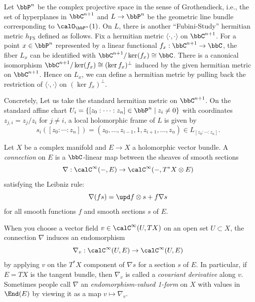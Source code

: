 \begin{example}\label{eg:Fubini-Study_metric_on_O_1}
	Let \(\bbP^n\) be the complex projective space in the sense of Grothendieck, i.e., the set of hyperplanes in \(\bbC^{n+1}\) and \(L \to \bbP^n\) be the geometric line bundle corresponding to \(\calO_{\bbP^n}(1)\).
	On \(L\), there is another ``Fubini-Study'' hermitian metric \(h_{\text{FS}}\) defined as follows.
	Fix a hermitian metric \(\langle \cdot, \cdot \rangle\) on \(\bbC^{n+1}\).
	For a point \(x \in \bbP^n\) represented by a linear functional \(f_x: \bbC^{n+1} \to \bbC\), the fiber \(L_x\) can be identified with \(\bbC^{n+1}/\ker(f_x) \cong \bbC\).
	There is a canonical isomorphism \(\bbC^{n+1}/\ker(f_x) \cong (\ker f_x)^\perp\) induced by the given hermitian metric on \(\bbC^{n+1}\).
	Hence on \(L_x\), we can define a hermitian metric by pulling back the restriction of \(\langle \cdot, \cdot \rangle\) on \((\ker f_x)^\perp\).

	Concretely, Let us take the standard hermitian metric on \(\bbC^{n+1}\).
	On the standard affine chart \(U_i = \{[z_0: \cdots : z_n] \in \bbP^n \mid z_i \neq 0\}\) with coordinates \(z_{j,i} = z_j/z_i\) for \(j \neq i\),
	a local holomorphic frame of \(L\) is given by
	\[s_i([z_0: \cdots : z_n]) = (z_0, \ldots, z_{i-1}, 1, z_{i+1}, \ldots, z_n) \in L_{[z_0: \cdots : z_n]}.\]

\end{example}



\begin{definition}\label{def:connection_on_holomorphic_vector_bundles}
	Let \(X\) be a complex manifold and \(E \to X\) a holomorphic vector bundle.
	A \emph{connection} on \(E\) is a \(\bbC\)-linear map between the sheaves of smooth sections
	\[\nabla: \calC^\infty(-, E) \to \calC^\infty(-, T^*X \otimes E)\]
	satisfying the Leibniz rule:
	\[\nabla(fs) = \upd f \otimes s + f \nabla s\]
	for all smooth functions \(f\) and smooth sections \(s\) of \(E\).
\end{definition}

When you choose a vector field \(v \in \calC^\infty(U, TX)\) on an open set \(U \subset X\), the connection \(\nabla\) induces an endomorphism
\[\nabla_v: \calC^\infty(U, E) \to \calC^\infty(U, E)\]
by applying \(v\) on the \(T^*X\) component of \(\nabla s\) for a section \(s\) of \(E\).
In particular, if \(E = TX\) is the tangent bundle, then \(\nabla_v\) is called a \emph{covariant derivative} along \(v\).
Sometimes people call \(\nabla\) an \emph{endomorphism-valued 1-form} on \(X\) with values in \(\End(E)\) by viewing it as a map \(v \mapsto \nabla_v\).

